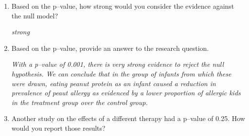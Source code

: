 \begin{enumerate}
\begin{key}
  {\it  I got $0/10000 < 0.0001$}
\end{key}

       Go back to  and change labels slightly to clear
       the plot and then  generate 
       another 5000 random shuffles. How  much does the strength of
       evidence change?
\begin{students}
 \vspace{1cm}
\end{students}

\begin{key}
  {\it I got $63/5000 =0.0126$. Little to no change. }
\end{key}
\vspace{1cm} 


    \item  Based on the p--value, how strong would you consider the
      evidence against the null model?  
\begin{students}
\vspace{1cm}
\end{students}

\begin{key}
  {\it    strong}
\end{key}


 
    \item  Based on the p--value, provide an answer to the research
      question.  
\begin{students}
\vspace{2cm}
\end{students}
\begin{key}
  {\it        With a p--value of 0.001, there is very  strong evidence to
      reject the null hypothesis.  We can conclude that in the
     group of infants from which these were drawn, eating peanut
     protein as an infant caused a reduction in prevalence of peaut
     allergy as evidenced by a lower proportion
      of allergic kids in the treatment group over the
      control group. }
\end{key}

    \item   Another study on the effects of a different therapy had a
      p--value of 0.25.  How would you report those results? 
\begin{students}
\vspace{3cm}
\end{students}


\end{enumerate}
